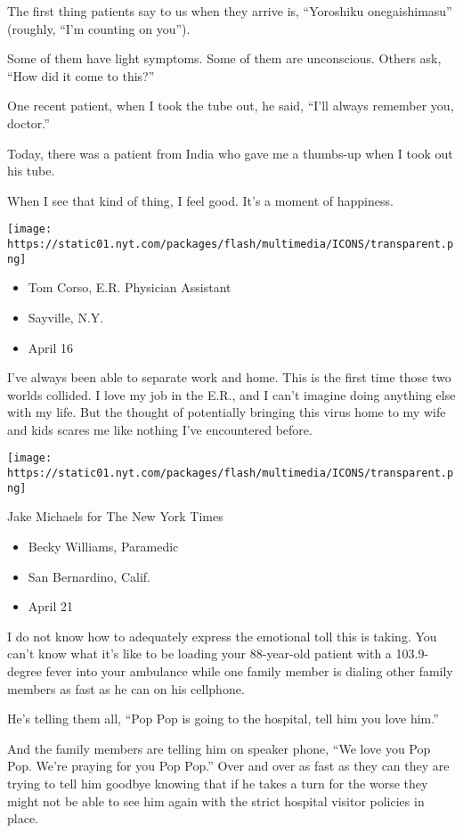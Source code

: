 The first thing patients say to us when they arrive is, ``Yoroshiku
onegaishimasu'' (roughly, ``I'm counting on you'').

Some of them have light symptoms. Some of them are unconscious. Others
ask, ``How did it come to this?''

One recent patient, when I took the tube out, he said, ``I'll always
remember you, doctor.''

Today, there was a patient from India who gave me a thumbs-up when I
took out his tube.

When I see that kind of thing, I feel good. It's a moment of happiness.

\texttt{[image: https://static01.nyt.com/packages/flash/multimedia/ICONS/transparent.png]}

\begin{itemize}
\tightlist
\item
  Tom Corso, E.R. Physician Assistant
\item
  Sayville, N.Y.
\item
  April 16
\end{itemize}

I've always been able to separate work and home. This is the first time
those two worlds collided. I love my job in the E.R., and I can't
imagine doing anything else with my life. But the thought of potentially
bringing this virus home to my wife and kids scares me like nothing I've
encountered before.

\texttt{[image: https://static01.nyt.com/packages/flash/multimedia/ICONS/transparent.png]}

Jake Michaels for The New York Times

\begin{itemize}
\tightlist
\item
  Becky Williams, Paramedic
\item
  San Bernardino, Calif.
\item
  April 21
\end{itemize}

I do not know how to adequately express the emotional toll this is
taking. You can't know what it's like to be loading your 88-year-old
patient with a 103.9-degree fever into your ambulance while one family
member is dialing other family members as fast as he can on his
cellphone.

He's telling them all, ``Pop Pop is going to the hospital, tell him you
love him.''

And the family members are telling him on speaker phone, ``We love you
Pop Pop. We're praying for you Pop Pop.'' Over and over as fast as they
can they are trying to tell him goodbye knowing that if he takes a turn
for the worse they might not be able to see him again with the strict
hospital visitor policies in place.


